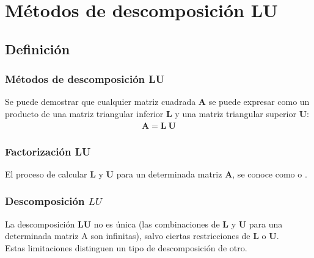 \section{Métodos de descomposición LU}
\subsection{Definición}
\begin{frame}
\frametitle{Métodos de descomposición \textbf{LU}}
Se puede demostrar que cualquier matriz cuadrada $\mathbf{A}$ se puede expresar como un producto de una matriz triangular inferior $\mathbf{L}$ y una matriz triangular superior $\mathbf{U}$:
\begin{align*}
\mathbf{A = L \: U}
\end{align*}
\end{frame}
\begin{frame}
\frametitle{Factorización \textbf{LU}}
El proceso de calcular $\mathbf{L}$ y $\mathbf{U}$ para un determinada matriz $\mathbf{A}$, se conoce como  o .
\end{frame}
\begin{frame}
\frametitle{Descomposición $LU$}
La descomposición $\mathbf{LU}$ no es única (las combinaciones de $\mathbf{L}$ y $\mathbf{U}$ para una determinada matriz A son infinitas), salvo ciertas restricciones de $\mathbf{L}$ o $\mathbf{U}$. 
\\
\bigskip
Estas limitaciones distinguen un tipo de descomposición de otro.
\end{frame}
